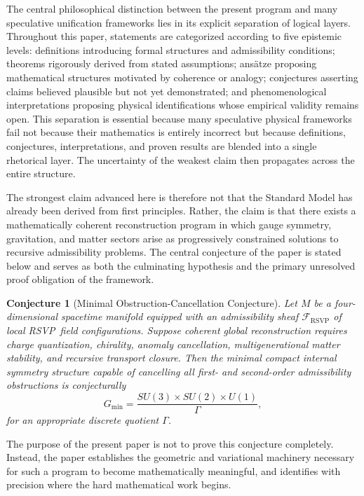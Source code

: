 \documentclass[12pt,a4paper]{article}
\newtheorem{conjecture}[definition]{Conjecture}
\newcommand{\RSVP}{\textrm{RSVP}}
\newcommand{\Sheaf}{\mathcal{F}}
\begin{document}
The central philosophical distinction between the present program and many
speculative unification frameworks lies in its explicit separation of logical
layers. Throughout this paper, statements are categorized according to five
epistemic levels: definitions introducing formal structures and admissibility
conditions; theorems rigorously derived from stated assumptions; ans\"{a}tze
proposing mathematical structures motivated by coherence or analogy; conjectures
asserting claims believed plausible but not yet demonstrated; and
phenomenological interpretations proposing physical identifications whose
empirical validity remains open. This separation is essential because many
speculative physical frameworks fail not because their mathematics is entirely
incorrect but because definitions, conjectures, interpretations, and proven
results are blended into a single rhetorical layer. The uncertainty of the
weakest claim then propagates across the entire structure.

The strongest claim advanced here is therefore not that the Standard Model has
already been derived from first principles. Rather, the claim is that there
exists a mathematically coherent reconstruction program in which gauge symmetry,
gravitation, and matter sectors arise as progressively constrained solutions to
recursive admissibility problems. The central conjecture of the paper is stated
below and serves as both the culminating hypothesis and the primary unresolved
proof obligation of the framework.

\begin{conjecture}[Minimal Obstruction-Cancellation Conjecture]
Let $M$ be a four-dimensional spacetime manifold equipped with an admissibility
sheaf $\Sheaf_{\RSVP}$ of local \RSVP\ field configurations. Suppose coherent
global reconstruction requires charge quantization, chirality, anomaly
cancellation, multigenerational matter stability, and recursive transport
closure. Then the minimal compact internal symmetry structure capable of
cancelling all first- and second-order admissibility obstructions is
conjecturally
\[
G_{\min} = \frac{SU(3)\times SU(2)\times U(1)}{\Gamma},
\]
for an appropriate discrete quotient $\Gamma$.
\end{conjecture}

The purpose of the present paper is not to prove this conjecture completely.
Instead, the paper establishes the geometric and variational machinery necessary
for such a program to become mathematically meaningful, and identifies with
precision where the hard mathematical work begins.
\end{document}
